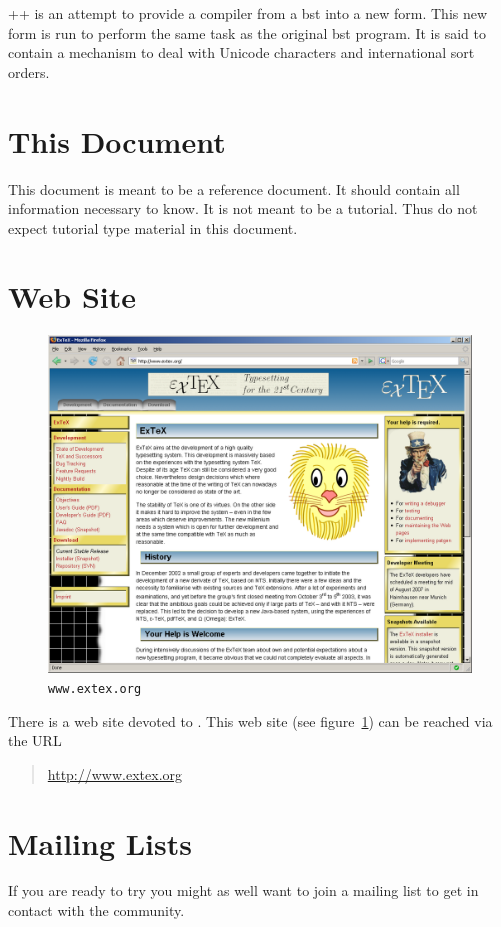 \BibTeX++ \cite{sastre.ea:bibtex++} is an
attempt to provide a compiler from a bst into a new form. This new
form is run to perform the same task as the original bst program. It
is said to contain a mechanism to deal with Unicode characters and
international sort orders.


\INCOMPLETE


\section{This Document}

This document is meant to be a reference document. It should contain
all information necessary to know. It is not meant to be a tutorial.
Thus do not expect tutorial type material in this document.


\section{Web Site}%

\begin{figure}[!ht]
  \centering
  \includegraphics[width=.5\textwidth]{img/www-extex-org}
  \caption{\texttt{www.extex.org}}
  \label{fig:www.exetex.org}
\end{figure}
There is a web site devoted to \ExTeX. This
web site (see figure~\ref{fig:www.exetex.org}) can be reached via the
URL
\begin{quotation}
  \url{http://www.extex.org}
\end{quotation}


\section{Mailing Lists}

If you are ready to try \ExBib{} you might as well want to join a
mailing list to get in contact with the community.

